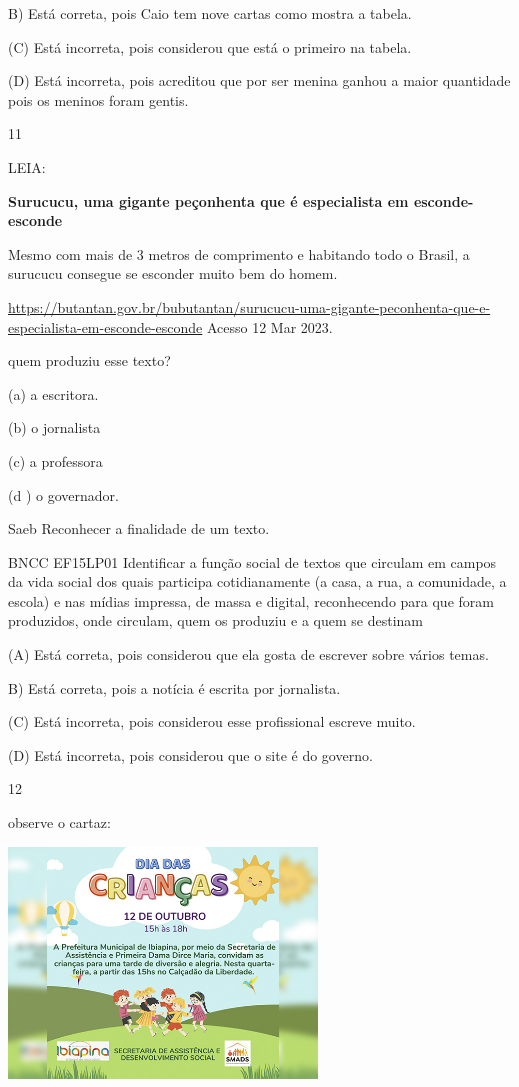 {{{{{{B) Está correta, pois Caio tem nove cartas como mostra a tabela.

(C) Está incorreta, pois considerou que está o primeiro na tabela.

(D) Está incorreta, pois acreditou que por ser menina ganhou a maior
quantidade pois os meninos foram gentis.

\num{11}

LEIA:

\textbf{Surucucu, uma gigante peçonhenta que é especialista em
esconde-esconde}

Mesmo com mais de 3 metros de comprimento e habitando todo o Brasil, a
surucucu consegue se esconder muito bem do homem.

\url{https://butantan.gov.br/bubutantan/surucucu-uma-gigante-peconhenta-que-e-especialista-em-esconde-esconde}
Acesso 12 Mar 2023.

quem produziu esse texto?

(a) a escritora.

(b) o jornalista

(c) a professora

(d ) o governador.

Saeb Reconhecer a finalidade de um texto.

BNCC EF15LP01 Identificar a função social de textos que circulam em
campos da vida social dos quais participa cotidianamente (a casa, a rua,
a comunidade, a escola) e nas mídias impressa, de massa e digital,
reconhecendo para que foram produzidos, onde circulam, quem os produziu
e a quem se destinam

(A) Está correta, pois considerou que ela gosta de escrever sobre vários
temas.

B) Está correta, pois a notícia é escrita por jornalista.

(C) Está incorreta, pois considerou esse profissional escreve muito.

(D) Está incorreta, pois considerou que o site é do governo.

\num{12}

observe o cartaz:

\includegraphics[width=3.22436in,height=2.42060in]{media/image181.jpeg}

}}}}}}
